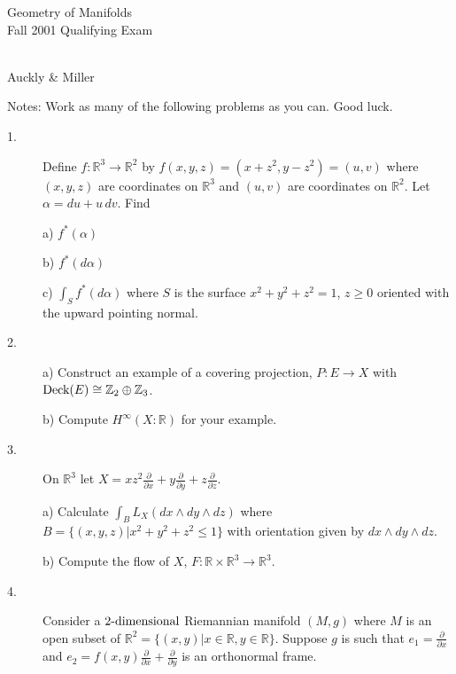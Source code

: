 \documentclass[12pt]{article}
\def\ds{\displaystyle}
\def\R{\mathbb R}
\def\Z{\mathbb Z}
\begin{document}
\begin{large}

\begin{center}
 {\bf
\begin{Large}
  Geometry of Manifolds\\
  Fall 2001  Qualifying Exam \end{Large} \\
  Auckly \& Miller}
\end{center}


\vspace{.2in}



Notes:
Work as many of the following problems as you can. Good luck.


\begin{description}

\item[1.]
Define $f:\R^3\to \R^2$ by
$ f(x,y,z)=(x+z^2, y-z^2)=(u,v) $
where $(x,y,z)$ are coordinates on $\R^3$ and $(u,v)$ are
coordinates on $\R^2$. Let $\alpha=du+u\,dv$. Find

\item[\quad] a) $f^\ast(\alpha)$
\item[\quad] b) $f^\ast(d\alpha)$
\item[\quad] c) $\int_Sf^\ast(d\alpha)$ where $S$ is the surface
$x^2+y^2+z^2=1$, $z\geq 0$
oriented with the upward pointing normal.

\item[2.] a)
Construct an example of a covering projection, $P:E\to X$
with $\hbox{Deck}(E)\cong \Z_2\oplus \Z_3$.

\item[\quad] b)
Compute $H^\infty(X:\R)$ for your example.


\item[3.]
On $\R^3$ let
$\ds X=xz^2\frac{\partial}{\partial x}+y\frac{\partial}{\partial y}
+z\frac{\partial}{\partial z}.$

\item[\quad] a) Calculate $\ds\int_BL_X(dx \wedge dy \wedge dz)$
where $B=\{(x,y,z)|x^2+y^2+z^2\leq 1\}$
with orientation given by $dx \wedge dy \wedge dz$.

\item[\quad] b)
Compute the flow of $X$, $F:\R\times\R^3\to \R^3$.


\item[4.]
Consider a $2\hbox{-dimensional}$ Riemannian manifold $(M,g)$ where
$M$ is an open subset of
$\R^2=\{(x,y)|x\in \R, y\in \R\}$. Suppose $g$ is such that
$\ds e_1=\frac{\partial}{\partial x}$
and $\ds e_2=f(x,y)\frac{\partial}{\partial x}+\frac{\partial}{\partial y}$
is an orthonormal frame.


\end{description}
\end{large}
\end{document}
